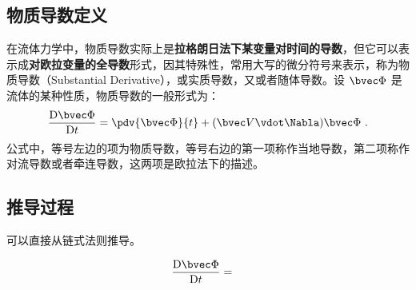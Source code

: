 
\begin{issues}
\issueDraft
\end{issues}

\subsection{物质导数定义}

在流体力学中，物质导数实际上是\textbf{拉格朗日法下某变量对时间的导数}，但它可以表示成\textbf{对欧拉变量的全导数}形式，因其特殊性，常用大写的微分符号来表示，称为物质导数（Substantial  Derivative），或实质导数，又或者随体导数。设 $\bvec \Phi$ 是流体的某种性质，物质导数的一般形式为：
\begin{equation}
\frac{\mathrm{D}\bvec \Phi }{\mathrm{D} t}=\pdv{\bvec \Phi}{t}+(\bvec V \vdot \Nabla)\bvec \Phi~.
\end{equation}
公式中，等号左边的项为物质导数，等号右边的第一项称作当地导数，第二项称作对流导数或者牵连导数，这两项是欧拉法下的描述。

\subsection{推导过程}
可以直接从链式法则推导。

\begin{equation}
\begin{aligned}
\frac{\text{D} \bvec \Phi}{\mathrm{D}t} &= 
\end{aligned}
\end{equation}
